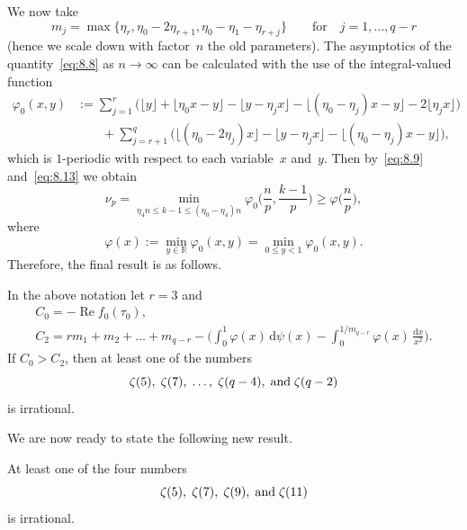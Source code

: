 \documentclass[a4paper,twoside]{article}
\numberwithin{equation}{section}
\renewcommand{\[}{\lfloor}
\renewcommand{\]}{\rfloor}
\newcommand{\<}{\langle}
\renewcommand{\>}{\rangle}
\renewcommand{\phi}{\varphi}
\renewcommand{\d}{\mathrm{d}}
\DeclareMathOperator{\Real}{Re}
\renewcommand{\Re}{\Real}
\newcommand{\rom}[1]{{\rm#1}}
\begin{document}
We now take
$$
m_j=\max\{\eta_r,\eta_0-2\eta_{r+1},\eta_0-\eta_1-\eta_{r+j}\}
\qquad\mbox{for}\quad j=1,\dots,q-r
$$
(hence we scale down with factor~$n$ the old parameters).
The asymptotics of the quantity~\eqref{eq:8.8} as $n\to\infty$
can be calculated with the use of the integral-valued
function
\begin{align*}
\phi_0(x,y)
&:=\sum_{j=1}^r\bigl(\[y\]+\[\eta_0x-y\]
-\[y-\eta_jx\]-\[(\eta_0-\eta_j)x-y\]-2\[\eta_jx\]\bigr)
\\ &\qquad
+\sum_{j=r+1}^q\bigl(\[(\eta_0-2\eta_j)x\]
-\[y-\eta_jx\]-\[(\eta_0-\eta_j)x-y\]\bigr),
\end{align*}
which is $1$-periodic with respect to each variable~$x$ and~$y$.
Then by~\eqref{eq:8.9} and~\eqref{eq:8.13} we obtain
$$
\nu_p=\min_{\eta_4n\le k-1\le(\eta_0-\eta_4)n}
\phi_0\biggl(\frac np,\frac{k-1}p\biggr)
\ge\phi\biggl(\frac np\biggr),
$$
where
$$
\phi(x):=\min_{y\in\mathbb R}\phi_0(x,y)
=\min_{0\le y<1}\phi_0(x,y).
$$
Therefore, the final result is as follows.

\begin{proposition}
\label{prop:5}
In the above notation let $r=3$ and
$$
\begin{gathered}
C_0=-\Re f_0(\tau_0),
\\
C_2=rm_1+m_2+\dots+m_{q-r}
-\biggl(\int_0^1\phi(x)\,\d\psi(x)
-\int_0^{1/m_{q-r}}\phi(x)\,\frac{\d x}{x^2}\biggr).
\end{gathered}
$$
If $C_0>C_2$\rom, then at least one of the numbers
$$
\zeta(5), \; \zeta(7), \; \dots, \; \zeta(q-4), \;
\mbox{and\/} \; \zeta(q-2)
$$
is irrational.
\end{proposition}

We are now ready to state the following new result.

\begin{theorem}
\label{th:3}
At least one of the four numbers
$$
\zeta(5), \; \zeta(7), \; \zeta(9), \; \mbox{and\/} \; \zeta(11)
$$
is irrational.
\end{theorem}
\end{document}
